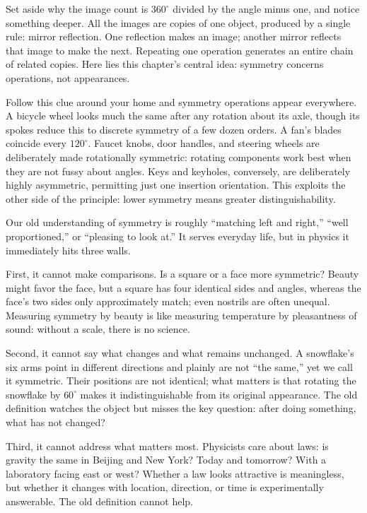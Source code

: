 Set aside why the image count is \(360^\circ\) divided by the angle minus one, and notice something deeper. All the images are copies of one object, produced by a single rule: mirror reflection. One reflection makes an image; another mirror reflects that image to make the next. Repeating one operation generates an entire chain of related copies. Here lies this chapter's central idea: symmetry concerns operations, not appearances.

Follow this clue around your home and symmetry operations appear everywhere. A bicycle wheel looks much the same after any rotation about its axle, though its spokes reduce this to discrete symmetry of a few dozen orders. A fan's blades coincide every \(120^\circ\). Faucet knobs, door handles, and steering wheels are deliberately made rotationally symmetric: rotating components work best when they are not fussy about angles. Keys and keyholes, conversely, are deliberately highly asymmetric, permitting just one insertion orientation. This exploits the other side of the principle: lower symmetry means greater distinguishability.


Our old understanding of symmetry is roughly ``matching left and right,'' ``well proportioned,'' or ``pleasing to look at.'' It serves everyday life, but in physics it immediately hits three walls.

First, it cannot make comparisons. Is a square or a face more symmetric? Beauty might favor the face, but a square has four identical sides and angles, whereas the face's two sides only approximately match; even nostrils are often unequal. Measuring symmetry by beauty is like measuring temperature by pleasantness of sound: without a scale, there is no science.

Second, it cannot say what changes and what remains unchanged. A snowflake's six arms point in different directions and plainly are not ``the same,'' yet we call it symmetric. Their positions are not identical; what matters is that rotating the snowflake by \(60^\circ\) makes it indistinguishable from its original appearance. The old definition watches the object but misses the key question: after doing something, what has not changed?

Third, it cannot address what matters most. Physicists care about laws: is gravity the same in Beijing and New York? Today and tomorrow? With a laboratory facing east or west? Whether a law looks attractive is meaningless, but whether it changes with location, direction, or time is experimentally answerable. The old definition cannot help.

